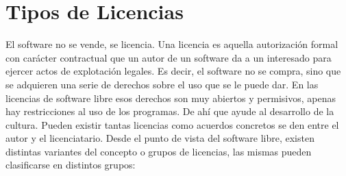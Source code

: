 \section {Tipos de Licencias}
El software no se vende, se licencia. Una licencia es aquella autorización formal con carácter contractual que un autor de un software da a un interesado para ejercer actos de explotación legales. Es decir, el software no se compra, sino que se adquieren una serie de derechos sobre el uso que se le puede dar. En las licencias de software libre esos derechos son muy abiertos y permisivos, apenas hay restricciones al uso de los programas. De ahí que ayude al desarrollo de la cultura. Pueden existir tantas licencias como acuerdos concretos se den entre el autor y el licenciatario. Desde el punto de vista del software libre, existen distintas variantes del concepto o grupos de licencias, las mismas pueden clasificarse en distintos grupos:\\

